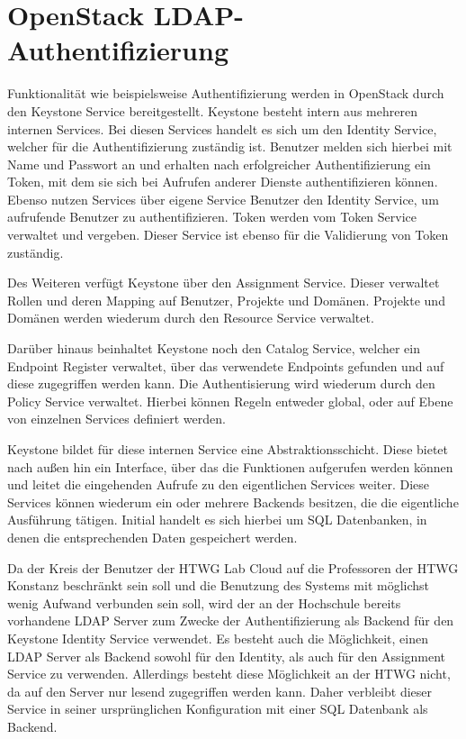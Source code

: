 \section{OpenStack LDAP-Authentifizierung}\label{ldap_auth1}
Funktionalität wie beispielsweise Authentifizierung werden in OpenStack durch den Keystone Service bereitgestellt.
Keystone besteht intern aus mehreren internen Services. Bei diesen Services handelt es sich um den Identity Service, welcher für die Authentifizierung zuständig ist. Benutzer melden sich hierbei mit Name und Passwort an und erhalten nach erfolgreicher Authentifizierung ein Token, mit dem sie sich bei Aufrufen anderer Dienste authentifizieren können. Ebenso nutzen Services über eigene Service Benutzer den Identity Service, um aufrufende Benutzer zu authentifizieren. Token werden vom Token Service verwaltet und vergeben. Dieser Service ist ebenso für die Validierung von Token zuständig.

Des Weiteren verfügt Keystone über den Assignment Service. Dieser verwaltet Rollen und deren Mapping auf Benutzer, Projekte und Domänen. Projekte und Domänen werden wiederum durch den Resource Service verwaltet.

Darüber hinaus beinhaltet Keystone noch den Catalog Service, welcher ein Endpoint Register verwaltet, über das verwendete Endpoints gefunden und auf diese zugegriffen werden kann. Die Authentisierung wird wiederum durch den Policy Service verwaltet. Hierbei können Regeln entweder global, oder auf Ebene von einzelnen Services definiert werden.

Keystone bildet für diese internen Service eine Abstraktionsschicht. Diese bietet nach außen hin ein Interface, über das die Funktionen aufgerufen werden können und leitet die eingehenden Aufrufe zu den eigentlichen Services weiter. Diese Services können wiederum ein oder mehrere Backends besitzen, die die eigentliche Ausführung tätigen. Initial handelt es sich hierbei um SQL Datenbanken, in denen die entsprechenden Daten gespeichert werden.

Da der Kreis der Benutzer der HTWG Lab Cloud auf die Professoren der HTWG Konstanz beschränkt sein soll und die Benutzung des Systems mit möglichst wenig Aufwand verbunden sein soll, wird der an der Hochschule bereits vorhandene LDAP Server zum Zwecke der Authentifizierung als Backend für den Keystone Identity Service verwendet.
Es besteht auch die Möglichkeit, einen LDAP Server als Backend sowohl für den Identity, als auch für den Assignment Service zu verwenden. Allerdings besteht diese Möglichkeit an der HTWG nicht, da auf den Server nur lesend zugegriffen werden kann. Daher verbleibt dieser Service in seiner ursprünglichen Konfiguration mit einer SQL Datenbank als Backend.

